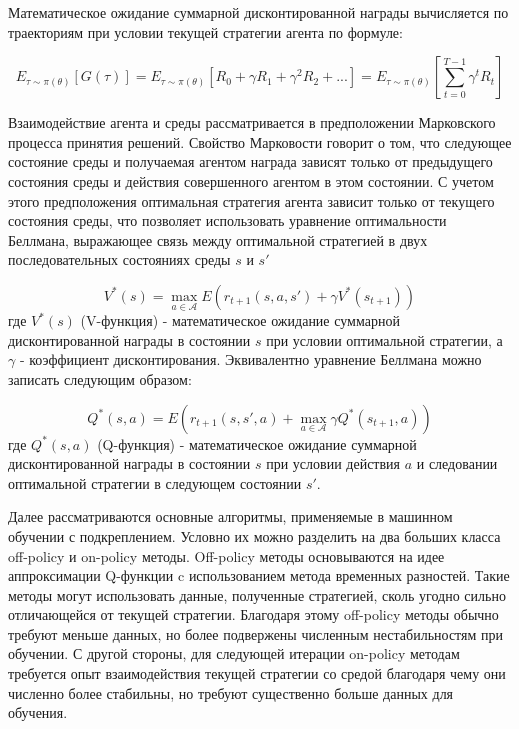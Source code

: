 Математическое ожидание суммарной дисконтированной награды вычисляется по траекториям при условии текущей стратегии агента по формуле: 

\[
E_{\tau \sim \pi(\theta)} [G(\tau)] = E_{\tau \sim \pi(\theta)} [R_0 + \gamma R_{1} + \gamma ^ 2 R_{2} + ...] = E_{\tau \sim \pi(\theta)} [\sum_{t=0}^{T - 1} \gamma ^t R_{t}]
\]

Взаимодействие агента и среды рассматривается в предположении Марковского процесса принятия решений. Свойство Марковости говорит о том, что следующее состояние среды и получаемая агентом награда зависят только от предыдущего состояния среды и действия совершенного агентом в этом состоянии. 
С учетом этого предположения оптимальная стратегия агента зависит только от текущего состояния среды, что позволяет использовать уравнение оптимальности Беллмана, выражающее связь между оптимальной стратегией в двух последовательных состояниях среды $s$ и $s'$

\[
	V^*(s) = \max_{a \in \mathcal{A}} E(r_{t + 1}(s, a, s') + \gamma V^*(s_{t + 1}))
\]
где $V^*(s)$ (V-функция) - математическое ожидание суммарной дисконтированной награды в состоянии $s$ при условии оптимальной стратегии, а $\gamma$ - коэффициент дисконтирования. Эквивалентно уравнение Беллмана можно записать следующим образом: 

\[
	Q^*(s, a) = E(r_{t + 1}(s, s', a) + \max_{a \in \mathcal{A}} \gamma Q^*(s_{t + 1}, a))
\]
где $Q^*(s, a)$ (Q-функция) - математическое ожидание суммарной дисконтированной награды в состоянии $s$ при условии действия $a$ и следовании оптимальной стратегии в следующем состоянии $s'$.

Далее рассматриваются основные алгоритмы, применяемые в машинном обучении с подкреплением. Условно их можно разделить на два больших класса off-policy и on-policy методы. Off-policy методы основываются на идее аппроксимации Q-функции c использованием метода временных разностей. Такие методы могут использовать данные, полученные стратегией, сколь угодно сильно отличающейся от текущей стратегии. Благодаря этому off-policy методы обычно требуют меньше данных, но более подвержены численным нестабильностям при обучении. С другой стороны, для следующей итерации on-policy методам требуется опыт взаимодействия текущей стратегии со средой благодаря чему они численно более стабильны, но требуют существенно больше данных для обучения. 

